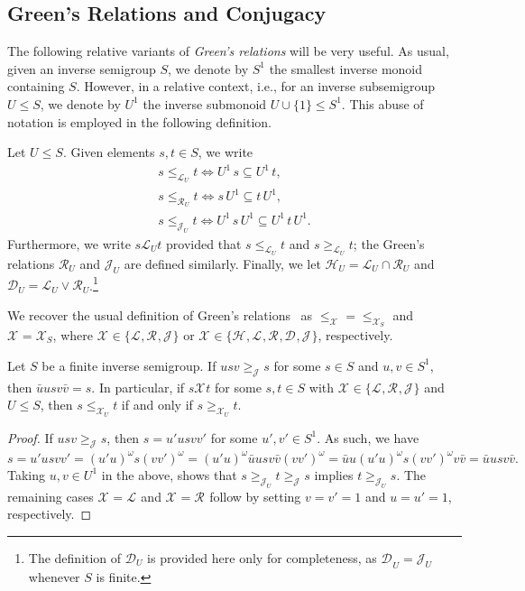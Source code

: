 \documentclass[anonymous,letter,UKenglish,cleveref,autoref,thm-restate]{lipics-v2021}
\renewcommand{\geq}{\geqslant}
\renewcommand{\leq}{\leqslant}
\newcommand*{\gH}[1][]{\mathrel{\mathcal{H}_{#1}}}
\newcommand*{\gL}[1][]{\mathrel{\mathcal{L}_{#1}}}
\newcommand*{\gR}[1][]{\mathrel{\mathcal{R}_{#1}}}
\newcommand*{\gD}[1][]{\mathrel{\mathcal{D}_{#1}}}
\newcommand*{\gJ}[1][]{\mathrel{\mathcal{J}_{#1}}}
\newcommand*{\gX}[1][]{\mathrel{\mathcal{X}_{#1}}}
\newcommand*{\gLle}[1][]{\leq_{\mathcal{L}_{#1}}}
\newcommand*{\gLge}[1][]{\geq_{\mathcal{L}_{#1}}}
\newcommand*{\gRle}[1][]{\leq_{\mathcal{R}_{#1}}}
\newcommand*{\gJle}[1][]{\leq_{\mathcal{J}_{#1}}}
\newcommand*{\gJge}[1][]{\geq_{\mathcal{J}_{#1}}}
\newcommand*{\gXle}[1][]{\leq_{\mathcal{X}_{#1}}}
\newcommand*{\gXge}[1][]{\geq_{\mathcal{X}_{#1}}}
\theoremstyle{plain}
\theoremstyle{plain}
\begin{document}
\subsection{Green's Relations and Conjugacy}\label{sec:Green-conjugacy}

The following relative variants of \emph{Green's relations} will be very useful.
As usual, given an inverse semigroup $S$, we denote by $S^1$ the smallest inverse monoid containing $S$.
However, in a relative context, i.e., for an inverse subsemigroup $U \leq S$, we denote by $U^1$ the inverse submonoid $U \cup \{1\} \leq S^1$.
This abuse of notation is employed in the following definition.

\begin{definition}
	Let $U \leq S$.
	Given elements $s,t \in S$, we write 
	\begin{gather*}
		s \gLle[U] t \iff U^1 \, s \subseteq U^1 \, t, \\
		s \gRle[U] t \iff s \, U^1 \subseteq t \, U^1, \\
		s \gJle[U] t \iff U^1 \, s \, U^1 \subseteq U^1 \, t \, U^1.
	\end{gather*}
	Furthermore, we write $s \gL[U] t$ provided that $s \gLle[U] t$ and $s \gLge[U] t$; the Green's relations $\gR[U]$ and $\gJ[U]$ are defined similarly.
  Finally, we let ${\gH[U]} = {\gL[U] \cap \gR[U]}$ and ${\gD[U]} = {\gL[U] \vee \gR[U]}$.\footnote{The definition of ${\gD[U]}$ is provided here only for completeness, as ${\gD_U} = {\gJ[U]}$ whenever $S$ is finite.}
\end{definition}

We recover the usual definition of Green's relations~\cite{gre51:short} as ${\gXle} = {\gXle[S]}$ and ${\gX} = {\gX[S]}$, where ${\gX} \in \{ {\gL}, {\gR}, {\gJ} \}$ or ${\gX} \in \{ {\gH}, {\gL}, {\gR}, {\gD}, {\gJ} \}$, respectively.

\begin{lemma}\label{lem:green-semi_rel}
  Let $S$ be a finite inverse semigroup. 
  If $u s v \gJge s$ for some $s \in S$ and $u,v \in S^1$, then $\bar u u s v \bar v = s$.
  In particular, if $s \gX t$ for some $s,t \in S$ with ${\gX} \in \{ {\gL}, {\gR}, {\gJ} \}$ and $U \leq S$, then $s \gXle[U] t$ if and only if $s \gXge[U] t$.
\end{lemma}
\begin{proof}
  If $u s v \gJge s$, then $s = u' u s v v'$ for some $u', v' \in S^1$.
	As such, we have
	\begin{equation*}
    s = u' u s v v' = (u' u)^\omega s (v v')^\omega = (u' u)^\omega \bar u u s v \bar v (v v')^\omega
    = \bar u u (u' u)^\omega s (v v')^\omega v \bar v = \bar u u s v \bar v.
	\end{equation*}
  Taking $u,v \in U^1$ in the above, shows that $s \gJge[U] t \gJge s$ implies $t \gJge[U] s$.
	The remaining cases ${\gX} = {\gL}$ and ${\gX} = {\gR}$ follow by setting $v = v' = 1$ and $u = u' = 1$, respectively.
\end{proof}
\end{document}
